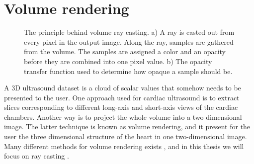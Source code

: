 \section{Volume rendering}\label{sec:volren}
\begin{figure}
\centering
{}
\caption{The principle behind volume ray casting. a) A ray is casted out from every pixel in the output image. Along the ray, samples are gathered from the volume. The samples are assigned a color and an opacity before they are combined into one pixel value. b) The opacity transfer function used to determine how opaque a sample should be.}
\label{fig:vr}
\end{figure}
A 3D ultrasound dataset is a cloud of scalar values that somehow needs to be presented to the user. One approach used for cardiac ultrasound  is to extract slices corresponding to different long-axis and short-axis views of the cardiac chambers. Another way is to project the whole volume into a two dimensional image. The latter technique is known as volume rendering, and it present for the user the three dimensional structure of the heart in one two-dimensional image. Many different methods for volume rendering exists \cite{brodlie2001}, and in this thesis we will focus on ray casting \cite{Levoy1988}. 

